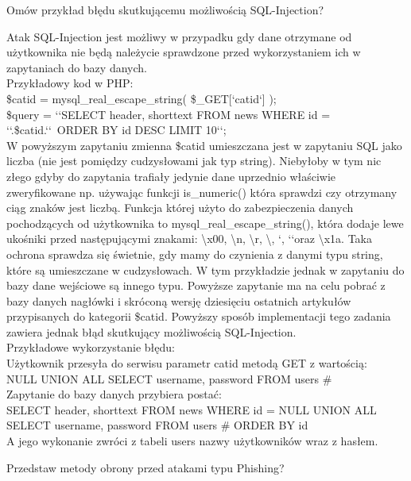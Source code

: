 \documentclass[answers,11pt]{exam}
\begin{document}
\begin{questions}
\question Omów przykład błędu skutkującemu możliwością SQL-Injection?
\begin{solution}
Atak SQL-Injection jest możliwy w przypadku gdy dane otrzymane od użytkownika nie będą należycie sprawdzone przed wykorzystaniem ich w zapytaniach do bazy danych.\\
Przykładowy kod w PHP:\\
\$catid = mysql\_real\_escape\_string( \$\_GET[\lq catid\lq ] );\\
\$query = \lq\lq SELECT header, shorttext FROM news WHERE id = \lq\lq.\$catid.\lq\lq\ ORDER BY id DESC LIMIT 10\lq\lq;\\
W powyższym zapytaniu zmienna \$catid umieszczana jest w zapytaniu SQL jako liczba (nie jest pomiędzy cudzysłowami jak typ string). Niebyłoby w tym nic złego gdyby do zapytania trafiały jedynie dane uprzednio właściwie zweryfikowane np. używając funkcji is\_numeric() która sprawdzi czy otrzymany ciąg znaków jest liczbą. Funkcja której użyto do zabezpieczenia danych pochodzących od użytkownika to mysql\_real\_escape\_string(), która dodaje lewe ukośniki przed następującymi znakami: \textbackslash x00, \textbackslash n, \textbackslash r, \textbackslash, \lq, \lq\lq oraz \textbackslash x1a. Taka ochrona sprawdza się świetnie, gdy mamy do czynienia z danymi typu string, które są umieszczane w cudzysłowach. W tym przykładzie jednak w zapytaniu do bazy dane wejściowe są  innego typu. Powyższe zapytanie ma na celu pobrać z bazy danych nagłówki i skróconą wersję dziesięciu ostatnich artykułów przypisanych do kategorii \$catid. Powyższy sposób implementacji tego zadania zawiera jednak błąd skutkujący możliwością SQL-Injection.\\
Przykładowe wykorzystanie błędu:\\
Użytkownik przesyła do serwisu parametr catid metodą GET z wartością:\\
NULL UNION ALL SELECT username, password FROM users \# \\
Zapytanie do bazy danych przybiera postać:\\
SELECT header, shorttext FROM news WHERE id = NULL UNION ALL SELECT username, password FROM users \# ORDER BY id\\
A jego wykonanie zwróci z tabeli users nazwy użytkowników wraz z hasłem.
\end{solution}

\question Przedstaw metody obrony przed atakami typu Phishing?


\end{questions}
\end{document}
